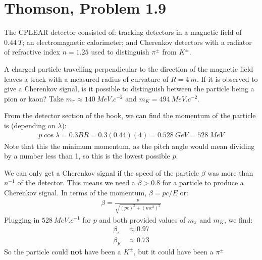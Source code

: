 \documentclass[12pt]{article}
\begin{document}
\section{Thomson, Problem 1.9}
\begin{problem}
  The CPLEAR detector consisted of: tracking detectors in a magnetic field of $\SI{0.44}{T}$; an electromagnetic calorimeter; and Cherenkov detectors with a radiator of refractive index $n=1.25$ used to distinguish $\pi^\pm$ from $K^\pm$.

  A charged particle travelling perpendicular to the direction of the magnetic field leaves a track with a measured radius of curvature of $R=\SI{4}{m}$. If it is observed to give a Cherenkov signal, is it possible to distinguish between the particle being a pion or kaon? Take $m_\pi\approx\SI{140}{MeV.c^{-2}}$ and $m_K=\SI{494}{MeV.c^{-2}}$.
\end{problem}
From the detector section of the book, we can find the momentum of the particle is (depending on $\lambda$):
\begin{align*}
  p\cos\lambda=0.3 BR=0.3 (0.44) (4)=\SI{0.528}{GeV}=\SI{528}{MeV}
\end{align*}
Note that this the minimum momentum, as the pitch angle would mean dividing by a number less than 1, so this is the lowest possible $p$.

We can only get a Cherenkov signal if the speed of the particle $\beta$ was more than $n^{-1}$ of the detector. This means we need a $\beta>0.8$ for a particle to produce a Cherenkov signal. In terms of the momentum, $\beta=pc/E$ or:
\begin{align*}
  \beta=\frac{p}{\sqrt{{(pc)}^2+{(mc^2)}^2}}
\end{align*}
Plugging in $\SI{528}{MeV.c^{-1}}$ for $p$ and both provided values of $m_\pi$ and $m_K$, we find:
\begin{equation}
  \label{eq:p8}
  \begin{aligned}
    \beta_\pi &\approx 0.97\\
    \beta_K &\approx 0.73
  \end{aligned}
\end{equation}
So the particle could \textbf{not} have been a $K^\pm$, but it could have been a $\pi^\pm$
\newpage
\end{document}
